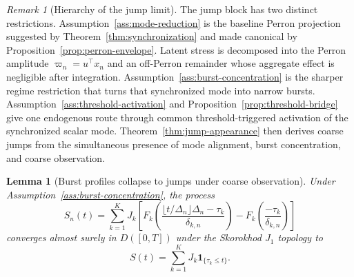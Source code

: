 \documentclass[11pt,a4paper]{amsart}
\theoremstyle{plain}
\newtheorem{lemma}[theorem]{Lemma}
\theoremstyle{definition}
\theoremstyle{remark}
\newtheorem{remark}[theorem]{Remark}
\newcommand{\one}{\mathbf{1}}
\begin{document}
\begin{remark}[Hierarchy of the jump limit]
The jump block has two distinct restrictions.  Assumption~\ref{ass:mode-reduction} is the baseline
Perron projection suggested by Theorem~\ref{thm:synchronization} and made canonical by
Proposition~\ref{prop:perron-envelope}.  Latent stress is decomposed into the Perron amplitude
\(\varpi_n=u^\top x_n\) and an off-Perron remainder whose aggregate effect is negligible after
integration.  Assumption~\ref{ass:burst-concentration} is the sharper regime restriction that turns
that synchronized mode into narrow bursts.  Assumption~\ref{ass:threshold-activation} and
Proposition~\ref{prop:threshold-bridge} give one endogenous route through common
threshold-triggered activation of the synchronized scalar mode.  Theorem~\ref{thm:jump-appearance}
then derives coarse jumps from the simultaneous presence of mode alignment, burst concentration, and
coarse observation.
\end{remark}

\begin{lemma}[Burst profiles collapse to jumps under coarse observation]\label{lem:profile-collapse}
Under Assumption~\ref{ass:burst-concentration}, the process
\[
        S_n(t)
        =
        \sum_{k=1}^K
        J_k\left[
        F_k\!\left(\frac{\lfloor t/\Delta_n\rfloor\Delta_n-\tau_k}{\delta_{k,n}}\right)
        -
        F_k\!\left(\frac{-\tau_k}{\delta_{k,n}}\right)
        \right]
\]
converges almost surely in \(D([0,T])\) under the Skorokhod \(J_1\) topology to
\[
        S(t)
        =
        \sum_{k=1}^K J_k\one_{\{\tau_k\le t\}}.
\]
\end{lemma}
\end{document}
